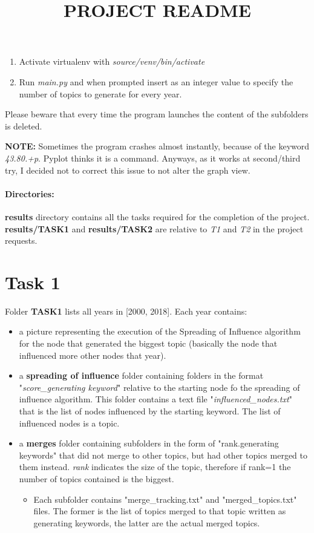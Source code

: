 \documentclass[11pt]{article}
\title{PROJECT README}
\begin{document}
\begin{enumerate}
	\item Activate virtualenv with \textit{source/venv/bin/activate}
	\item Run \textit{main.py} and when prompted insert as an integer value to specify the number of topics to generate for every year.
\end{enumerate}
Please beware that every time the program launches the content of the subfolders is deleted.

\textbf{NOTE:} Sometimes the program crashes almost instantly, because of the keyword \textit{43.80.+p}. Pyplot thinks it is a command. Anyways, as it works at second/third try, I decided not to correct this issue to not alter the graph view.\\
\paragraph{Directories:}
\textbf{results} directory contains all the tasks required for the completion of the project.\\
	\textbf{results/TASK1} and \textbf{results/TASK2} are relative to \textit{T1} and \textit{T2} in the project requests.
	
\section{Task 1}
Folder \textbf{TASK1} lists all years in [2000, 2018].
Each year contains:
\begin{itemize}
	\item a picture representing the execution of the Spreading of Influence algorithm for the node that generated the biggest topic (basically the node that influenced more other nodes that year).
	\item a \textbf{spreading of influence} folder containing folders in the format "\textit{score\_generating keyword}" relative to the starting node fo the spreading of influence algorithm. This folder contains a text file "\textit{influenced\_nodes.txt}" that is the list of nodes influenced by the starting keyword. The list of influenced nodes is a topic.
	\item a \textbf{merges} folder containing subfolders in the form of "rank.generating keywords" that did not merge to other topics, but had other topics merged to them instead. \textit{rank} indicates the size of the topic, therefore if rank=1 the number of topics contained is the biggest.
	    \begin{itemize}
	    	\item Each subfolder contains "merge\_tracking.txt" and "merged\_topics.txt" files. The former is the list of topics merged to that topic written as generating keywords, the latter are the actual merged topics.
	    \end{itemize}
\end{itemize}
\end{document}
